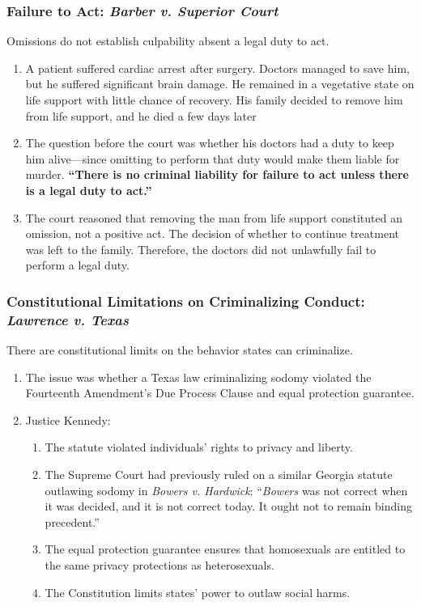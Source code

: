 \subsubsection{Failure to Act: \emph{Barber v. Superior Court}}

Omissions do not establish culpability absent a legal duty to act.

\begin{enumerate}
    \item A patient suffered cardiac arrest after surgery. Doctors managed to 
    save him, but he suffered significant brain damage. He remained in a 
    vegetative state on life support with little chance of recovery. His 
    family decided to remove him from life support, and he died a few days 
    later
    \item The question before the court was whether his doctors had a duty to 
    keep him alive---since omitting to perform that duty would make them 
    liable for murder. \textbf{``There is no criminal liability for failure to 
    act unless there is a legal duty to act.''}
    \item The court reasoned that removing the man from life support 
    constituted an omission, not a positive act. The decision of whether to 
    continue treatment was left to the family. Therefore, the doctors did not 
    unlawfully fail to perform a legal duty.
\end{enumerate}

\subsubsection{Constitutional Limitations on Criminalizing Conduct: 
\emph{Lawrence v. Texas}}

There are constitutional limits on the behavior states can criminalize.

\begin{enumerate}
    \item The issue was whether a Texas law criminalizing sodomy violated the 
    Fourteenth Amendment's Due Process Clause and equal protection guarantee.
    \item Justice Kennedy:
    \begin{enumerate}
        \item The statute violated individuals' rights to privacy and liberty.
        \item The Supreme Court had previously ruled on a similar Georgia 
        statute outlawing sodomy in \emph{Bowers v. Hardwick}: ``\emph{Bowers} 
        was not correct when it was decided, and it is not correct today. It 
        ought not to remain binding precedent.''
        \item The equal protection guarantee ensures that homosexuals are 
        entitled to the same privacy protections as heterosexuals.
        \item The Constitution limits states' power to outlaw social harms.
    \end{enumerate}
\end{enumerate}


